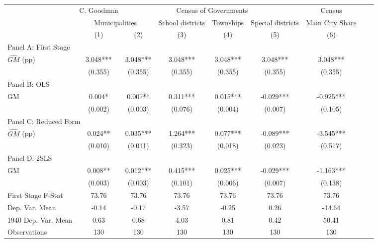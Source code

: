  \begin{tabular}{l*{8}{c}} \toprule
&\multicolumn{1}{c}{C. Goodman}&\multicolumn{4}{c}{Census of Governments}&\multicolumn{1}{c}{Census}\\\cmidrule(lr){2-2}\cmidrule(lr){3-6}\cmidrule(lr){7-7}
&\multicolumn{2}{c}{Municipalities}&\multicolumn{1}{c}{School districts}&\multicolumn{1}{c}{Townships}&\multicolumn{1}{c}{Special districts}&\multicolumn{1}{c}{Main City Share}\\\cmidrule(lr){2-3}\cmidrule(lr){4-6}\cmidrule(lr){7-7}
&\multicolumn{1}{c}{(1)}&\multicolumn{1}{c}{(2)}&\multicolumn{1}{c}{(3)}&\multicolumn{1}{c}{(4)}&\multicolumn{1}{c}{(5)}&\multicolumn{1}{c}{(6)}\\
\cmidrule(lr){1-7}
\multicolumn{6}{l}{Panel A: First Stage}\\
\cmidrule(lr){1-7}
$\widehat{GM}$ (pp)&    3.048***&    3.048***&    3.048***&    3.048***&    3.048***&    3.048***\\
                &  (0.355)   &  (0.355)   &  (0.355)   &  (0.355)   &  (0.355)   &  (0.355)   \\
\cmidrule(lr){1-7}
\multicolumn{6}{l}{Panel B: OLS}\\
\cmidrule(lr){1-7}
GM              &    0.004*  &    0.007** &    0.311***&    0.015***&   -0.029***&   -0.925***\\
                &  (0.002)   &  (0.003)   &  (0.076)   &  (0.004)   &  (0.007)   &  (0.105)   \\
\cmidrule(lr){1-7}
\multicolumn{6}{l}{Panel C: Reduced Form}\\
\cmidrule(lr){1-7}
$\widehat{GM}$ (pp)&    0.024** &    0.035***&    1.264***&    0.077***&   -0.089***&   -3.545***\\
                &  (0.010)   &  (0.011)   &  (0.323)   &  (0.018)   &  (0.023)   &  (0.517)   \\
\cmidrule(lr){1-7}
\multicolumn{6}{l}{Panel D: 2SLS}\\
\cmidrule(lr){1-7}
GM              &    0.008** &    0.012***&    0.415***&    0.025***&   -0.029***&   -1.163***\\
                &  (0.003)   &  (0.003)   &  (0.101)   &  (0.006)   &  (0.007)   &  (0.138)   \\
\midrule
First Stage F-Stat&    73.76   &    73.76   &    73.76   &    73.76   &    73.76   &    73.76   \\
Dep. Var. Mean  &    -0.14   &    -0.17   &    -3.57   &    -0.25   &     0.26   &   -14.64   \\
1940 Dep. Var. Mean&     0.63   &     0.68   &     4.03   &     0.81   &     0.42   &    50.41   \\
Observations    &      130   &      130   &      130   &      130   &      130   &      130   \\
 \bottomrule \end{tabular}
